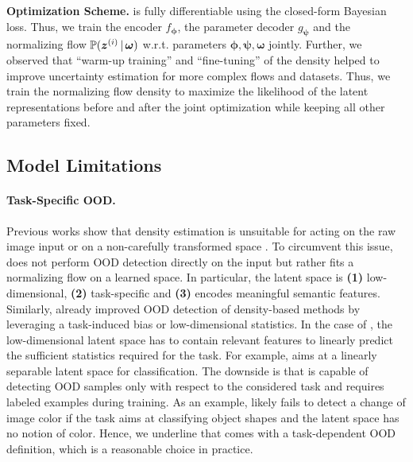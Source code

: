 \textbf{Optimization Scheme.} \NatPNacro{} is fully differentiable using the closed-form Bayesian loss. Thus, we train the encoder $f_{\bm{\phi}}$, the parameter decoder $g_{\bm{\psi}}$ and the normalizing flow $\operatorname{\mathbb{P}}(\bm{z}^{(i)} \,|\, \bm{\omega})$ w.r.t. parameters $\bm{\phi}, \bm{\psi}, \bm{\omega}$ jointly. Further, we observed that ``warm-up training'' \citep{warm-start} and ``fine-tuning'' \citep{fine-tuning-continuous} of the density helped to improve uncertainty estimation for more complex flows and datasets. Thus, we train the normalizing flow density to maximize the likelihood of the latent representations before and after the joint optimization while keeping all other parameters fixed.

\subsection{Model Limitations} \label{sec:limitations}

\paragraph{Task-Specific OOD.} Previous works show that density estimation is unsuitable for acting on the raw image input \citep{anomaly-detection,deep-generative,typicality_OOD_generative} or on a non-carefully transformed space \citep{perfect-density-no-ood-guarantee}. To circumvent this issue, \NatPNacro{} does not perform OOD detection directly on the input but rather fits a normalizing flow on a learned space. In particular, the latent space is \textbf{(1)} low-dimensional, \textbf{(2)} task-specific and \textbf{(3)} encodes meaningful semantic features. Similarly, \cite{postnet, why-nf-fail-ood, density-states-ood, contrastive-ood} already improved OOD detection of density-based methods by leveraging a task-induced bias or low-dimensional statistics. In the case of \NatPNacro{}, the low-dimensional latent space has to contain relevant features to linearly predict the sufficient statistics required for the task. For example, \NatPNacro{} aims at a linearly separable latent space for classification. The downside is that \NatPNacro{} is capable of detecting OOD samples only with respect to the considered task and requires labeled examples during training. As an example, \NatPNacro{} likely fails to detect a change of image color if the task aims at classifying object shapes and the latent space has no notion of color. Hence, we underline that \NatPNacro{} comes with a task-dependent OOD definition, which is a reasonable choice in practice.

